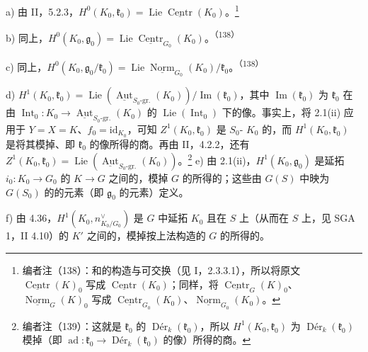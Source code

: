 a) 由 II，5.2.3，$H^0(K_0,\mathfrak k_0)=\operatorname{Lie}\underline{\operatorname{Centr}}(K_0)$。\footnote{编者注（138）：和的构造与可交换（见 I，2.3.3.1），所以将原文 $\underline{\operatorname{Centr}}(K)_0$ 写成 $\underline{\operatorname{Centr}}(K_0)$；同样，将 $\underline{\operatorname{Centr}}_G(K)_0$、$\underline{\operatorname{Norm}}_G(K)_0$ 写成 $\underline{\operatorname{Centr}}_{G_0}(K_0)$、$\underline{\operatorname{Norm}}_{G_0}(K_0)$。}

b) 同上，$H^0(K_0,\mathfrak g_0)=\operatorname{Lie}\underline{\operatorname{Centr}}_{G_0}(K_0)$。\textsuperscript{（138）}

c) 同上，$H^0(K_0,\mathfrak g_0/\mathfrak k_0)=\operatorname{Lie}\underline{\operatorname{Norm}}_{G_0}(K_0)/\mathfrak k_0$。\textsuperscript{（138）}

d) $H^1(K_0,\mathfrak k_0)=\operatorname{Lie}(\underline{\operatorname{Aut}}_{S_0\text{-gr.}}(K_0))/\operatorname{Im}(\mathfrak k_0)$，其中 $\operatorname{Im}(\mathfrak k_0)$ 为 $\mathfrak k_0$ 在由 $\operatorname{Int}_0:K_0\to\underline{\operatorname{Aut}}_{S_0\text{-gr.}}(K_0)$ 的 $\operatorname{Lie}(\operatorname{Int}_0)$ 下的像。事实上，将 2.1(ii) 应用于 $Y=X=K$、$f_0=\mathrm{id}_{K_0}$，可知 $Z^1(K_0,\mathfrak k_0)$ 是 $S_0$- $K_0$ 的，而 $H^1(K_0,\mathfrak k_0)$ 是将其模掉、即 $\mathfrak k_0$ 的像所得的商。再由 II，4.2.2，还有 $Z^1(K_0,\mathfrak k_0)=\operatorname{Lie}(\underline{\operatorname{Aut}}_{S_0\text{-gr.}}(K_0))$。\footnote{编者注（139）：这就是 $\mathfrak k_0$ 的 $\operatorname{D\text{é}r}_k(\mathfrak k_0)$，所以 $H^1(K_0,\mathfrak k_0)$ 为 $\operatorname{D\text{é}r}_k(\mathfrak k_0)$ 模掉（即 $\operatorname{ad}:\mathfrak k_0\to\operatorname{D\text{é}r}_k(\mathfrak k_0)$ 的像）所得的商。}
e) 由 2.1(ii)，$H^1(K_0,\mathfrak g_0)$ 是延拓 $i_0:K_0\to G_0$ 的 $K\to G$ 之间的，模掉 $G$ 的所得的；这些由 $G(S)$ 中映为 $G(S_0)$ 的的元素（即 $\mathfrak g_0$ 的元素）定义。

f) 由 4.36，$H^1(K_0,n_{K_0/G_0}^\vee)$ 是 $G$ 中延拓 $K_0$ 且在 $S$ 上（从而在 $S$ 上，见 SGA 1，II 4.10）的 $K'$ 之间的，模掉按上法构造的 $G$ 的所得的。

